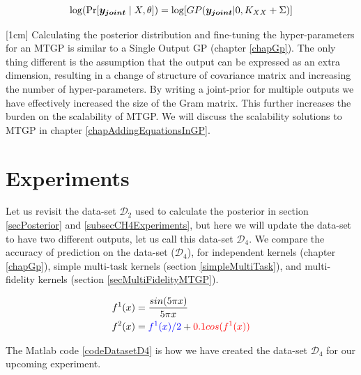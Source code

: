   \begin{equation}\label{eq:exactMONLML}
\log(\Pr[\boldsymbol{y_{joint}} \mid X, \theta]) = \log[GP(\boldsymbol{y_{joint}}| 0, K_{XX} + \Sigma )]
  \end{equation}
  
[1cm]
Calculating the posterior distribution and fine-tuning the hyper-parameters for an MTGP is similar to a Single Output GP (chapter \ref{chapGp}). The only thing different is the assumption that the output can be expressed as an extra dimension, resulting in a change of structure of covariance matrix and increasing the number of hyper-parameters. By writing a joint-prior for multiple outputs we have effectively increased the size of the Gram matrix. This further increases the burden on the scalability of MTGP. We will discuss the scalability solutions to MTGP in chapter \ref{chapAddingEquationsInGP}. 

\section{Experiments}\label{subsecCh6Experiments}
\begin{mdframed}[hidealllines=true,backgroundcolor=lightgray!20]
Let us revisit the data-set $\mathcal{D}_{2}$ used to calculate the posterior in section \ref{secPosterior} and \ref{subsecCH4Experiments}, but here we will update the data-set to have two different outputs, let us call this data-set $\mathcal{D}_{4}$. We compare the accuracy of prediction on the data-set ($\mathcal{D}_{4}$), for independent kernels (chapter \ref{chapGp}), simple multi-task kernels (section \ref{simpleMultiTask}), and multi-fidelity kernels (section \ref{secMultiFidelityMTGP}). 

\begin{align}\label{eqFunctionForD4}
f^{1}(x) & = \frac{sin(5 \pi x)}{5 \pi x} \\
f^{2}(x) & = \textcolor{blue}{f^{1}(x)/2} +\textcolor{red}{0.1cos(f^{1}(x))}
\end{align}

\end{mdframed}

The Matlab code \ref{codeDatasetD4} is how we have created the data-set $\mathcal{D}_{4}$ for our upcoming experiment. 

